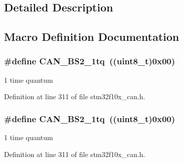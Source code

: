 \subsection{Detailed Description}


\subsection{Macro Definition Documentation}
\subsubsection[{\texorpdfstring{C\+A\+N\+\_\+\+B\+S2\+\_\+1tq}{CAN_BS2_1tq}}]{\setlength{\rightskip}{0pt plus 5cm}\#define C\+A\+N\+\_\+\+B\+S2\+\_\+1tq~(({\bf uint8\+\_\+t})0x00)}\hypertarget{group___c_a_n__time__quantum__in__bit__segment__2_gad9af25a3f61df7b09b8d6a5e81d8027e}{}\label{group___c_a_n__time__quantum__in__bit__segment__2_gad9af25a3f61df7b09b8d6a5e81d8027e}
1 time quantum 

Definition at line 311 of file stm32f10x\+\_\+can.\+h.

\subsubsection[{\texorpdfstring{C\+A\+N\+\_\+\+B\+S2\+\_\+1tq}{CAN_BS2_1tq}}]{\setlength{\rightskip}{0pt plus 5cm}\#define C\+A\+N\+\_\+\+B\+S2\+\_\+1tq~(({\bf uint8\+\_\+t})0x00)}\hypertarget{group___c_a_n__time__quantum__in__bit__segment__2_gad9af25a3f61df7b09b8d6a5e81d8027e}{}\label{group___c_a_n__time__quantum__in__bit__segment__2_gad9af25a3f61df7b09b8d6a5e81d8027e}
1 time quantum 

Definition at line 311 of file stm32f10x\+\_\+can.\+h.

